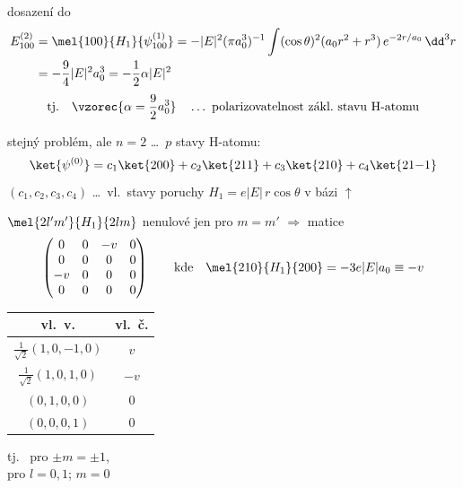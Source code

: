 dosazení do
\begin{align*}
  E_{100}^{(2)} &= \mel{100}{H_1}{\psi_{100}^{(1)}} = -|E|^2(\pi a_0^3)^{-1}\int(\cos\theta)^2(a_0r^2 + r^3)\,e^{-2r/a_0}\,\dd^3r \\
  &= -\frac94|E|^2a_0^3 = -\frac12\alpha|E|^2
\end{align*}
\[
  \text{tj.}\quad \vzorec{\alpha = \frac92 a_0^3} \quad\dots\ \text{polarizovatelnost zákl.\ stavu H-atomu}
\]

\begin{priklad}
stejný problém, ale $n = 2$ \dots\ $p$ stavy H-atomu:
\[
  \ket{\psi^{(0)}} = c_1\ket{200} + c_2\ket{211} + c_3\ket{210} + c_4\ket{21{-1}}
\]
$(c_1,c_2,c_3,c_4)$ \dots\ vl.\ stavy poruchy $H_1 = e|E|\,r\cos\theta$ v bázi $\uparrow$

$\mel{2l'm'}{H_1}{2lm}$ nenulové jen pro $m = m'$ \quad $\Rightarrow$ \quad matice
\[
  \begin{pmatrix} 0 & 0 & -v & 0\\ 0 & 0 & 0 & 0\\ -v & 0 & 0 & 0\\ 0 & 0 & 0 & 0\end{pmatrix}
  \qquad\text{kde}\quad \mel{210}{H_1}{200} = -3e|E|a_0 \equiv -v
\]
\begin{center}
\renewcommand{\arraystretch}{1.4}
\begin{tabular}{cc}
vl.\ v. & vl.\ č. \\ \hline
$\tfrac{1}{\sqrt2}(1,0,-1,0)$ & $v$ \\
$\tfrac{1}{\sqrt2}(1,0,1,0)$ & $-v$ \\
$(0,1,0,0)$ & $0$ \\
$(0,0,0,1)$ & $0$
\end{tabular}
\qquad
\begin{minipage}{0.4\textwidth}
tj.\  pro $\pm m = \pm1$, \\
 pro $l = 0,1$; $m = 0$
\end{minipage}
\end{center}
\end{priklad}

